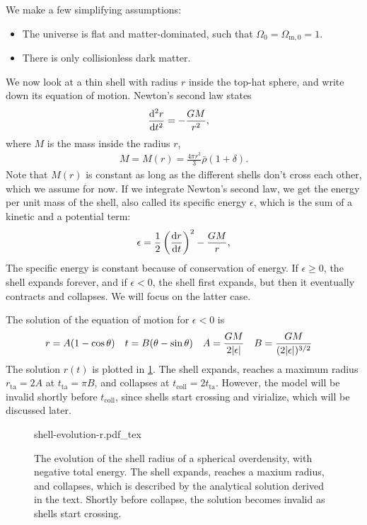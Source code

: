 We make a few simplifying assumptions:
\begin{itemize}
	\item The universe is flat and matter-dominated, such that $\Omega_0 = \Omega_{\text{m}, 0} = 1$.
	\item There is only collisionless dark matter.
\end{itemize}
We now look at a thin shell with radius $r$ inside the top-hat sphere, and write down its equation of motion. Newton's second law states
\begin{align*}
	\dv[2]{r}{t}
	&= - \frac{G M}{r^2},
\end{align*}
where $M$ is the mass inside the radius $r$,
\begin{align*}
	M = M(r) = \frac{4\pi r^3}{3} \bar{\rho}(1+\delta).
\end{align*}
Note that $M(r)$ is constant as long as the different shells don't cross each other, which we assume for now. 
If we integrate Newton's second law, we get the energy per unit mass of the shell, also called its specific energy $\epsilon$, which is the sum of a kinetic and a potential term:
\begin{align*}
	\epsilon = \frac{1}{2} \left( \dv{r}{t} \right)^2
	- \frac{G M}{r},
\end{align*}
The specific energy is constant because of conservation of energy.
If $\epsilon \geq 0$, the shell expands forever, and if $\epsilon < 0$, the shell first expands, but then it eventually contracts and collapses. We will focus on the latter case.

The solution of the equation of motion for $\epsilon < 0$ is
\begin{align*}
	r &= A(1- \cos \theta) &
	t &= B(\theta - \sin\theta) &
	A &= \frac{GM}{2 \vert\epsilon\vert} &
	B &= \frac{GM}{(2 \vert\epsilon\vert)^{3/2}}
\end{align*}
The solution $r(t)$ is plotted in \cref{fig:shell-collapse-r}.
The shell expands, reaches a maximum radius $r_\text{ta} = 2 A$ at $t_\text{ta} = \pi B$, and collapses at $t_\text{coll} = 2 t_\text{ta}$.
However, the model will be invalid shortly before $t_\text{coll}$, since shells start crossing and virialize, which will be discussed later.
\begin{figure}
	\centering
	{shell-evolution-r.pdf_tex}
	\caption{The evolution of the shell radius of a spherical overdensity, with negative total energy. The shell expands, reaches a maxium radius, and collapses, which is described by the analytical solution derived in the text. Shortly before collapse, the solution becomes invalid as shells start crossing.}
	\label{fig:shell-collapse-r}
\end{figure}



